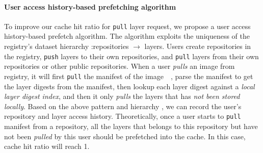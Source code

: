 \paragraph{User access history-based prefetching algorithm}
To improve our cache hit ratio for \texttt{pull} layer request, we propose a user access history-based prefetch algorithm. The algorithm
exploits the uniqueness of the registry's 
dataset hierarchy
:repositories $\rightarrow$ layers.
Users create repositories in the registry, \texttt{push} layers to their own repositories,
and \texttt{pull} layers from their own repositories or other public repositories. 
When a user \emph{pulls} an image from registry, it will first \texttt{pull} the manifest of the image~\cite{docker}~\cite{dockerworkload},
parse the manifest to get the layer digests from the manifest,
then lookup each layer digest against a \emph{local layer digest index},
and then it only \emph{pulls} the layers that has \emph{not been stored locally}.
%
Based on the above 
pattern and hierarchy 
, we can record the user's repository and layer access history. 
Theoretically, once a user starts to \texttt{pull} manifest from a repository, all the layers that belongs to this repository but have not been \emph{pulled} by this user should be prefetched into the cache.
In this case, cache hit ratio will reach 1.

